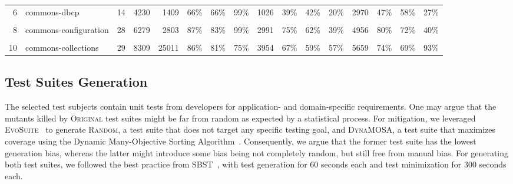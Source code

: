 \documentclass[sigconf]{acmart}
\newcommand{\Evosuite}{\textsc{EvoSuite}\xspace}
\newcommand{\original}{\textsc{Original}\xspace}
\newcommand{\EvosuiteRandom}{\textsc{Random}\xspace}
\newcommand{\EvosuiteDynamosa}{\textsc{DynaMOSA}\xspace}
\begin{document}
\begin{table}
\begin{tabular}{|r| l | r | r | r|r|r|r | r|r|r|r | r|r|r|r |}
6 & commons-dbcp            & 14	  & 4230	& 1409	& 66\% & 66\% & 99\%  & 1026	& 39\% & 42\% & 20\% & 2970	  & 47\% & 58\% & 27\% \\
\cellcolor[HTML]{FFFF00}{7} & \cellcolor[HTML]{FFFF00}{commons-csv}             & \cellcolor[HTML]{FFFF00}{2}	    & \cellcolor[HTML]{FFFF00}{635}		& \cellcolor[HTML]{FFFF00}{312}		& \cellcolor[HTML]{FFFF00}{89\%} & \cellcolor[HTML]{FFFF00}{85\%} & \cellcolor[HTML]{FFFF00}{81\%}  & \cellcolor[HTML]{FFFF00}{365}		& \cellcolor[HTML]{FFFF00}{78\%} & \cellcolor[HTML]{FFFF00}{63\%} & \cellcolor[HTML]{FFFF00}{60\%} & \cellcolor[HTML]{FFFF00}{647}		& \cellcolor[HTML]{FFFF00}{89\%} & \cellcolor[HTML]{FFFF00}{83\%} & \cellcolor[HTML]{FFFF00}{76\%} \\
8 & commons-configuration   & 28		& 6279	& 2803	& 87\% & 83\% & 99\%  & 2991	& 75\% & 62\% & 39\% & 4956	  & 80\% & 72\% & 40\% \\
\cellcolor[HTML]{FFFF00}{9} & \cellcolor[HTML]{FFFF00}{commons-compress}        & \cellcolor[HTML]{FFFF00}{24}  	& \cellcolor[HTML]{FFFF00}{9566}	& \cellcolor[HTML]{FFFF00}{1047}	& \cellcolor[HTML]{FFFF00}{84\%} & \cellcolor[HTML]{FFFF00}{76\%} & \cellcolor[HTML]{FFFF00}{65\%}  & \cellcolor[HTML]{FFFF00}{2610} 	& \cellcolor[HTML]{FFFF00}{63\%} & \cellcolor[HTML]{FFFF00}{45\%} & \cellcolor[HTML]{FFFF00}{44\%} & \cellcolor[HTML]{FFFF00}{4306}	  & \cellcolor[HTML]{FFFF00}{70\%} & \cellcolor[HTML]{FFFF00}{57\%} & \cellcolor[HTML]{FFFF00}{49\%} \\
10 & commons-collections    & 29  	& 8309 	& 25011 & 86\% & 81\% & 75\%  & 3954 	&	67\% & 59\% & 57\% & 5659	  &	74\% & 69\% & 93\% \\
    \hline
\end{tabular}
\label{tbl:subjectmeasures}
\end{table}

\subsection{Test Suites Generation}
\label{sec:testgeneration}
The selected test subjects contain unit tests
from developers %
for application- and
domain-specific requirements.
One may argue that the mutants killed by
\original test suites might be far from random as expected by a statistical process.
For mitigation,
we leveraged \Evosuite~\cite{fraser2011evosuite}
to generate \EvosuiteRandom, a test suite that does not target any specific testing goal,
and \EvosuiteDynamosa, a test suite that maximizes coverage using the Dynamic Many-Objective Sorting Algorithm~\cite{panichella2015reformulating}.
Consequently, we argue that the former test suite has the lowest generation bias, whereas
the latter might introduce some bias being not completely random, but still free from manual bias.
For generating both test suites, we followed the best practice from
SBST~\cite{devroey2020java,panichella2021sbst,DBLP:conf/sbst/GambiJRZ22},
with test generation for 60 seconds each and test minimization for 300 seconds each.
\end{document}

